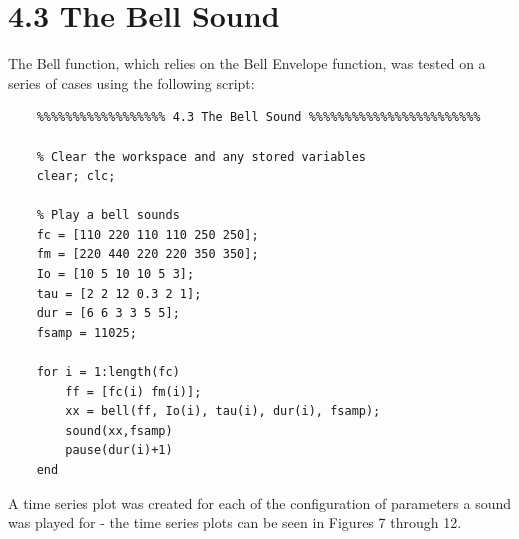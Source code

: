 \documentclass{article}
\begin{document}
\section{4.3 The Bell Sound}
The Bell function, which relies on the Bell Envelope function, was tested on a series of cases using the following script:
\begin{lstlisting}
	%%%%%%%%%%%%%%%%%% 4.3 The Bell Sound %%%%%%%%%%%%%%%%%%%%%%%%
	
	% Clear the workspace and any stored variables
	clear; clc;
	
	% Play a bell sounds
	fc = [110 220 110 110 250 250];
	fm = [220 440 220 220 350 350];
	Io = [10 5 10 10 5 3];
	tau = [2 2 12 0.3 2 1];
	dur = [6 6 3 3 5 5];
	fsamp = 11025;
	
	for i = 1:length(fc)
	    ff = [fc(i) fm(i)];
	    xx = bell(ff, Io(i), tau(i), dur(i), fsamp);
	    sound(xx,fsamp)
	    pause(dur(i)+1)
	end
\end{lstlisting}
A time series plot was created for each of the configuration of parameters a sound was played for - the time series plots can be seen in Figures 7 through 12.
\end{document}
